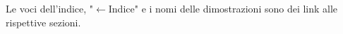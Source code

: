 \documentclass[12pt, a4paper]{article}
\begin{document}
	\maketitle\thispagestyle{empty}
	\begin{center}
		\tiny Le voci dell'indice, "$\leftarrow$Indice" e i nomi delle dimostrazioni sono dei link alle rispettive sezioni.
	\end{center}
	\tableofcontents\label{toc}
	
\end{document}
